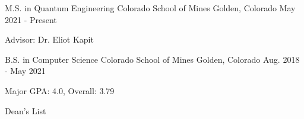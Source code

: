 


\begin{cventries}

  \cventry
    {M.S. in Quantum Engineering} %
    {Colorado School of Mines} %
    {Golden, Colorado} %
    {May 2021 - Present} %
    {
      \begin{cvitems} %
        \item{Advisor: Dr. Eliot Kapit}
      \end{cvitems}
    }
    
  \cventry
    {B.S. in Computer Science} %
    {Colorado School of Mines} %
    {Golden, Colorado} %
    {Aug. 2018 - May 2021} %
    {
      \begin{cvitems} %
        \item{Major GPA: 4.0, Overall: 3.79}
        \item{Dean's List}
      \end{cvitems}
    }

\end{cventries}
